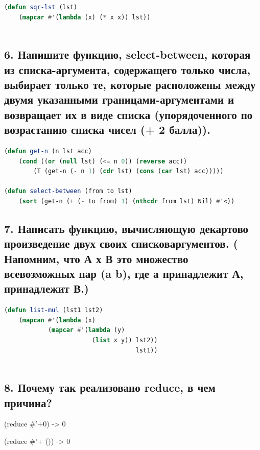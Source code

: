 \documentclass[12pt]{report}
\begin{document}
\begin{lstlisting}[label=6xd, caption=Решение задания №5, language=lisp]
(defun sqr-lst (lst) 
	(mapcar #'(lambda (x) (* x x)) lst))
	
\end{lstlisting}

\subsection*{6.  Напишите функцию, select-between, которая из списка-аргумента, содержащего только
	числа, выбирает только те, которые расположены между двумя указанными границами-аргументами и возвращает их в виде списка (упорядоченного по возрастанию списка чисел
	(+ 2 балла)).}

\begin{lstlisting}[label=6xd, caption=Решение задания №6, language=lisp]
(defun get-n (n lst acc)
	(cond ((or (null lst) (<= n 0)) (reverse acc))
		(T (get-n (- n 1) (cdr lst) (cons (car lst) acc)))))

(defun select-between (from to lst)
	(sort (get-n (+ (- to from) 1) (nthcdr from lst) Nil) #'<))

\end{lstlisting}

\subsection*{7. Написать функцию, вычисляющую декартово произведение двух своих списковаргументов. ( Напомним, что А х В это множество всевозможных пар (a b), где а
	принадлежит А, принадлежит В.)}

\begin{lstlisting}[label=6xd, caption=Решение задания №7, language=lisp]	
(defun list-mul (lst1 lst2)
	(mapcan #'(lambda (x)
			(mapcar #'(lambda (y)
						(list x y)) lst2))
									lst1))
	
\end{lstlisting}

\subsection*{8. Почему так реализовано reduce, в чем причина?}

(reduce \#'+0) -> 0

(reduce \#'+ ()) -> 0
\end{document}
